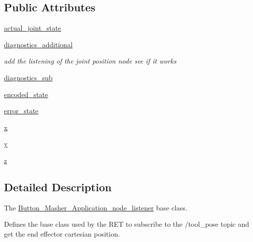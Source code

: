 \subsection*{Public Attributes}
\begin{DoxyCompactItemize}
\item 
\hyperlink{classButton__Masher__Application__Output_1_1Button__Masher__Application__node__listener_a9f8b9688c7b9b90edfb25073b9b9d727}{actual\+\_\+joint\+\_\+state}
\item 
\hyperlink{classButton__Masher__Application__Output_1_1Button__Masher__Application__node__listener_a3b8138a5340814532912cab43b64fa2e}{diagnostics\+\_\+additional}
\begin{DoxyCompactList}\small\item\em add the listening of the joint position node see if it works \end{DoxyCompactList}\item 
\hyperlink{classButton__Masher__Application__Output_1_1Button__Masher__Application__node__listener_a547b75f681b266f91f9cc485c2f3b714}{diagnostics\+\_\+sub}
\item 
\hyperlink{classButton__Masher__Application__Output_1_1Button__Masher__Application__node__listener_a4e790a9b608d07d8c1273ce749657a55}{encoded\+\_\+state}
\item 
\hyperlink{classButton__Masher__Application__Output_1_1Button__Masher__Application__node__listener_a954c5caf30928503ff36b24cc6d6414d}{error\+\_\+state}
\item 
\hyperlink{classButton__Masher__Application__Output_1_1Button__Masher__Application__node__listener_a9336ebf25087d91c818ee6e9ec29f8c1}{x}
\item 
\hyperlink{classButton__Masher__Application__Output_1_1Button__Masher__Application__node__listener_a2fb1c5cf58867b5bbc9a1b145a86f3a0}{y}
\item 
\hyperlink{classButton__Masher__Application__Output_1_1Button__Masher__Application__node__listener_a25ed1bcb423b0b7200f485fc5ff71c8e}{z}
\end{DoxyCompactItemize}


\subsection{Detailed Description}
The \hyperlink{classButton__Masher__Application__Output_1_1Button__Masher__Application__node__listener}{Button\+\_\+\+Masher\+\_\+\+Application\+\_\+node\+\_\+listener} base class. 

Defines the base class used by the R\+ET to subscribe to the /tool\+\_\+pose topic and get the end effector cartesian position. 

